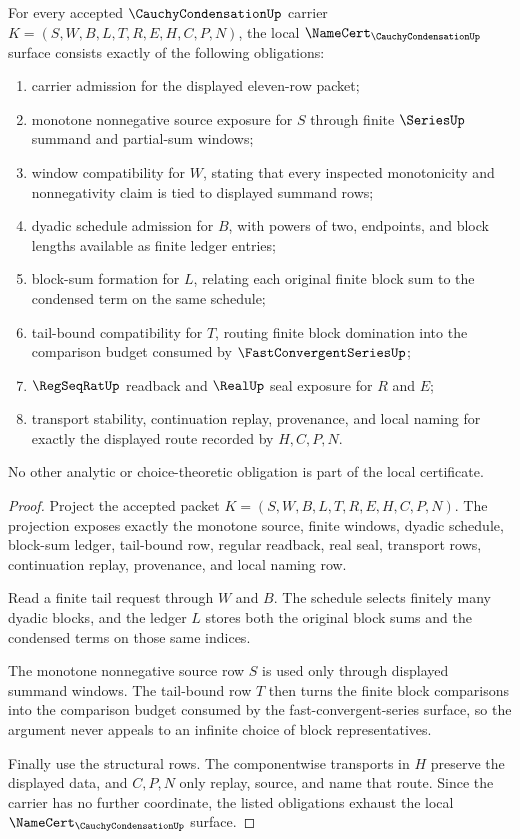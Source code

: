 \begin{theorem}
\label{thm:cauchy-condensation-namecert-obligations}
For every accepted $\CauchyCondensationUp$ carrier $K=(S,W,B,L,T,R,E,H,C,P,N)$, the local $\NameCert_{\CauchyCondensationUp}$ surface consists exactly of the following obligations:
\begin{enumerate}
\item carrier admission for the displayed eleven-row packet;
\item monotone nonnegative source exposure for $S$ through finite $\SeriesUp$ summand and partial-sum windows;
\item window compatibility for $W$, stating that every inspected monotonicity and nonnegativity claim is tied to displayed summand rows;
\item dyadic schedule admission for $B$, with powers of two, endpoints, and block lengths available as finite ledger entries;
\item block-sum formation for $L$, relating each original finite block sum to the condensed term on the same schedule;
\item tail-bound compatibility for $T$, routing finite block domination into the comparison budget consumed by $\FastConvergentSeriesUp$;
\item $\RegSeqRatUp$ readback and $\RealUp$ seal exposure for $R$ and $E$;
\item transport stability, continuation replay, provenance, and local naming for exactly the displayed route recorded by $H,C,P,N$.
\end{enumerate}
No other analytic or choice-theoretic obligation is part of the local certificate.
\end{theorem}
\begin{proof}
Project the accepted packet $K=(S,W,B,L,T,R,E,H,C,P,N)$. The projection exposes exactly the monotone source, finite windows, dyadic schedule, block-sum ledger, tail-bound row, regular readback, real seal, transport rows, continuation replay, provenance, and local naming row.

Read a finite tail request through $W$ and $B$. The schedule selects finitely many dyadic blocks, and the ledger $L$ stores both the original block sums and the condensed terms on those same indices.

The monotone nonnegative source row $S$ is used only through displayed summand windows. The tail-bound row $T$ then turns the finite block comparisons into the comparison budget consumed by the fast-convergent-series surface, so the argument never appeals to an infinite choice of block representatives.

Finally use the structural rows. The componentwise transports in $H$ preserve the displayed data, and $C,P,N$ only replay, source, and name that route. Since the carrier has no further coordinate, the listed obligations exhaust the local $\NameCert_{\CauchyCondensationUp}$ surface.
\end{proof}

